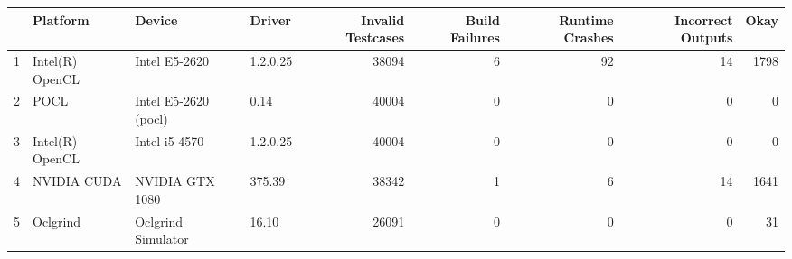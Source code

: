 \begin{tabular}{llllrrrrr}
\toprule
{} &         Platform &                Device &    Driver &  Invalid Testcases &  Build Failures &  Runtime Crashes &  Incorrect Outputs &  Okay \\
\midrule
1 &  Intel(R) OpenCL &         Intel E5-2620 &  1.2.0.25 &              38094 &               6 &               92 &                 14 &  1798 \\
2 &             POCL &  Intel E5-2620 (pocl) &      0.14 &              40004 &               0 &                0 &                  0 &     0 \\
3 &  Intel(R) OpenCL &         Intel i5-4570 &  1.2.0.25 &              40004 &               0 &                0 &                  0 &     0 \\
4 &      NVIDIA CUDA &       NVIDIA GTX 1080 &    375.39 &              38342 &               1 &                6 &                 14 &  1641 \\
5 &         Oclgrind &    Oclgrind Simulator &     16.10 &              26091 &               0 &                0 &                  0 &    31 \\
\bottomrule
\end{tabular}

